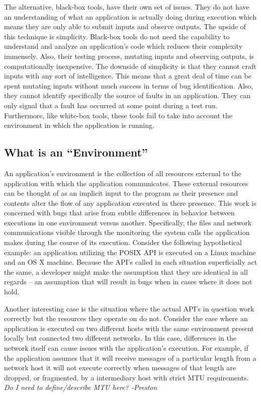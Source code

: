     The alternative, black-box tools, have their own set of issues. They do not have an understanding of what an
    application is actually doing during execution which means they are only able to submit inputs and observe
    outputs.  The upside of this technique is simplicity. Black-box tools do not need the capability to understand
    and analyze an application's code which reduces their complexity immensely. Also, their testing process,
    mutating inputs and observing outputs, is computationally inexpensive. The downside of simplicity is that they
    cannot craft inputs with any sort of intelligence. This means that a great deal of time can be spent mutating
    inputs without much success in terms of bug identification. Also, they cannot identify specifically the source
    of faults in an application. They can only signal that a fault has occurred at some point during a test run.
    Furthermore, like white-box tools, these tools fail to take into account the environment in which the
    application is running.

    \subsection{What is an ``Environment''}

    An application's environment is the collection of all resources external to the application with which the
    application communicates.  These external resources can be thought of as an implicit input to the program as their
    presence and contents alter the flow of any application executed in there presence.  This work is concerned with bugs
    that arise from subtle differences in behavior between executions in one environment versus another. Specifically, the
    files and network communications visible through the monitoring the system calls the application makes during the course
    of its execution.  Consider the following hypothetical example: an application utilizing the POSIX API is executed on a
    Linux machine and an OS X machine.  Because the API's called in each situation superficially act the same, a developer might
    make the assumption that they are identical in all regards -- an assumption that will result in bugs when in cases where
    it does not hold.

    Another interesting case is the situation where the actual API's in question work correctly but the resources they
    operate on do not.  Consider the case where an application is executed on two different hosts with the same environment
    present locally but connected two different networks.  In this case, differences in the network itself can cause issues
    with the application's execution.  For example, if the application assumes that it will receive messages of a particular
    length from a network host it will not execute correctly when messages of that length are dropped, or fragmented, by a
    intermediary host with strict MTU requirements. \emph{Do I need to define/describe MTU here? -Preston}

